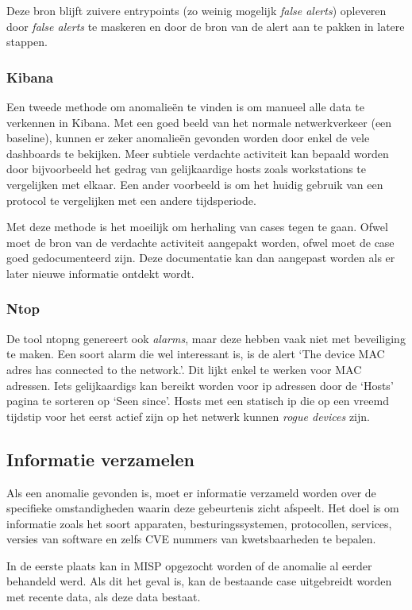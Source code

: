 \documentclass[a4paper,12pt]{report}
\begin{document}
Deze bron blijft zuivere entrypoints (zo weinig mogelijk \emph{false alerts}) opleveren door \emph{false alerts} te maskeren en door de bron van de alert aan te pakken in latere stappen.

\subsubsection{Kibana}
Een tweede methode om anomalieën te vinden is om manueel alle data te verkennen in Kibana.
Met een goed beeld van het normale netwerkverkeer (een baseline), kunnen er zeker anomalieën gevonden worden door enkel de vele dashboards te bekijken.
Meer subtiele verdachte activiteit kan bepaald worden door bijvoorbeeld het gedrag van gelijkaardige hosts zoals workstations te vergelijken met elkaar.
Een ander voorbeeld is om het huidig gebruik van een protocol te vergelijken met een andere tijdsperiode.

Met deze methode is het moeilijk om herhaling van cases tegen te gaan.
Ofwel moet de bron van de verdachte activiteit aangepakt worden, ofwel moet de case goed gedocumenteerd zijn.
Deze documentatie kan dan aangepast worden als er later nieuwe informatie ontdekt wordt.

\subsubsection{Ntop}
De tool ntopng genereert ook \emph{alarms}, maar deze hebben vaak niet met beveiliging te maken.
Een soort alarm die wel interessant is, is de alert `The device {MAC adres} has connected to the network.'.
Dit lijkt enkel te werken voor MAC adressen.
Iets gelijkaardigs kan bereikt worden voor ip adressen door de `Hosts' pagina te sorteren op `Seen since'.
Hosts met een statisch ip die op een vreemd tijdstip voor het eerst actief zijn op het netwerk kunnen \emph{rogue devices} zijn.

\subsection{Informatie verzamelen}
Als een anomalie gevonden is, moet er informatie verzameld worden over de specifieke omstandigheden waarin deze gebeurtenis zicht afspeelt.
Het doel is om informatie zoals het soort apparaten, besturingssystemen, protocollen, services, versies van software en zelfs CVE nummers van kwetsbaarheden te bepalen.

In de eerste plaats kan in MISP opgezocht worden of de anomalie al eerder behandeld werd.
Als dit het geval is, kan de bestaande case uitgebreidt worden met recente data, als deze data bestaat.
\end{document}
